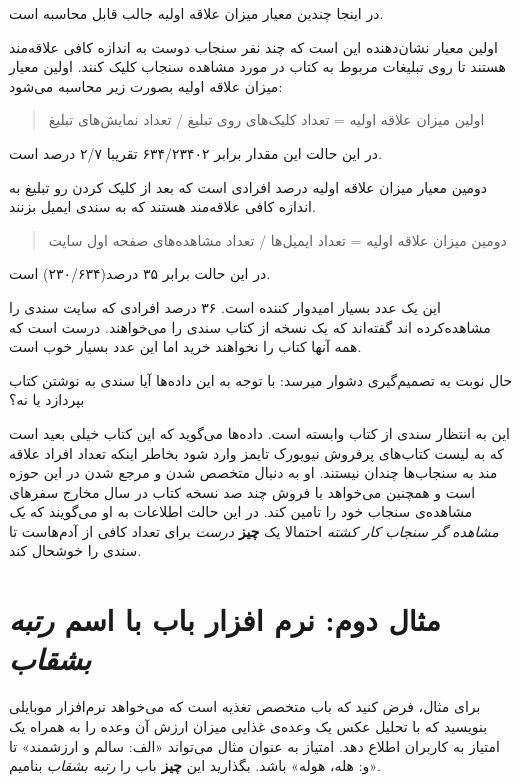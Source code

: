 در اینجا چندین معیار میزان علاقه اولیه جالب قابل محاسبه است.

اولین معیار نشان‌دهنده این است که چند نفر سنجاب دوست به اندازه کافی
علاقه‌مند هستند تا روی تبلیغات مربوط به کتاب در مورد مشاهده سنجاب کلیک
کنند. اولین معیار میزان علاقه اولیه بصورت زیر محاسبه می‌شود:

\begin{quote}
اولین میزان علاقه اولیه = تعداد کلیک‌های روی تبلیغ / تعداد نمایش‌های
تبلیغ
\end{quote}

در این حالت این مقدار برابر ۶۳۴/۲۳۴۰۲ تقریبا ۲/۷ درصد است.

دومین معیار میزان علاقه اولیه درصد افرادی است که بعد از کلیک کردن رو
تبلیغ به اندازه کافی علاقه‌مند هستند که به سندی ایمیل بز‌نند.

\begin{quote}
دومین میزان علاقه اولیه = تعداد ایمیل‌ها / تعداد مشاهده‌های صفحه اول
سایت
\end{quote}

در این حالت برابر ۳۵ درصد(۲۳۰/۶۳۴) است.

این یک عدد بسیار امیدوار کننده است. ۳۶ درصد افرادی که سایت سندی را
مشاهده‌کرده اند گفته‌اند که یک نسخه از کتاب سندی را می‌خواهند. درست است
که همه آنها کتاب را نخواهند خرید اما این عدد بسیار خوب است.

حال نوبت به تصمیم‌گیری دشوار میرسد: با توجه به این داده‌ها آیا سندی به
نوشتن کتاب بپردازد یا نه؟

این به انتظار سندی از کتاب وابسته است. داده‌ها می‌گوید که این کتاب خیلی
بعید است که به لیست کتاب‌های پرفروش نیویورک تایمز وارد شود بخاطر اینکه
تعداد افراد علاقه مند به سنجاب‌ها چندان نیستند. او به دنبال متخصص شدن و
مرجع شدن در این حوزه است و همچنین می‌خواهد با فروش چند صد نسخه کتاب در
سال مخارج سفرهای مشاهده‌ی سنجاب خود را تامین کند. در این حالت اطلاعات به
او می‌گویند که \emph{یک مشاهده گر سنجاب کار کشته} احتمالا یک
\textbf{چیز} \emph{درست} برای تعداد کافی از آدم‌هاست تا سندی را خوشحال
کند.

\section{\texorpdfstring{مثال دوم: نرم افزار باب با اسم \emph{رتبه
بشقاب}}{مثال دوم: نرم افزار باب با اسم رتبه بشقاب}}\label{ux645ux62bux627ux644-ux62fux648ux645-ux646ux631ux645-ux627ux641ux632ux627ux631-ux628ux627ux628-ux628ux627-ux627ux633ux645-ux631ux62aux628ux647-ux628ux634ux642ux627ux628}

برای مثال، فرض کنید که باب متخصص تغذیه است که می‌خواهد نرم‌افزار موبایلی
بنویسید که با تحلیل عکس یک وعده‌ی غذایی میزان ارزش آن وعده را به همراه
یک امتیاز به کاربران اطلاع دهد. امتیاز به عنوان مثال می‌تواند «الف: سالم
و ارزشمند» تا «و: هله، هوله» باشد. بگذارید این \textbf{چیز} باب را
\emph{رتبه بشقاب} بنامیم.

